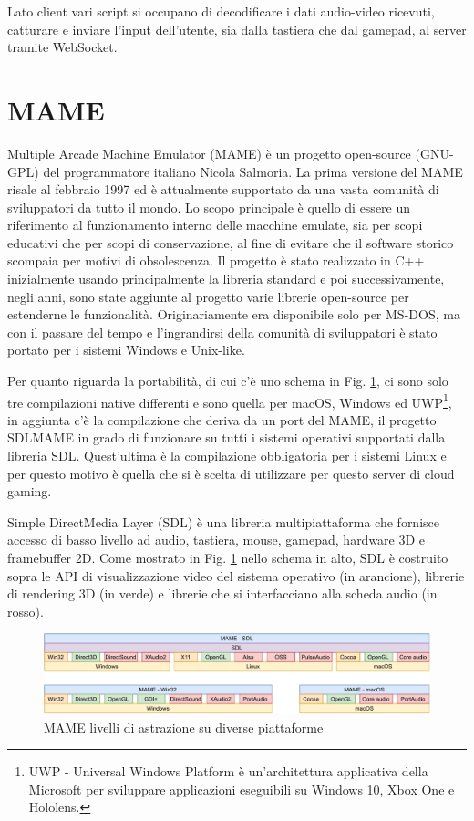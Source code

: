Lato client vari script si occupano di decodificare i dati audio-video ricevuti, catturare e inviare l'input dell'utente, sia dalla tastiera che dal gamepad, al server tramite WebSocket.



\section{MAME}
Multiple Arcade Machine Emulator (MAME) è un progetto open-source (GNU-GPL) del programmatore italiano Nicola Salmoria. La prima versione del MAME risale al febbraio 1997 ed è attualmente supportato da una vasta comunità di sviluppatori da tutto il mondo. Lo scopo principale è quello di essere un riferimento al funzionamento interno delle macchine emulate, sia per scopi educativi che per scopi di conservazione, al fine di evitare che il software storico scompaia per motivi di obsolescenza. Il progetto è stato realizzato in C++ inizialmente usando principalmente la libreria standard e poi successivamente, negli anni, sono state aggiunte al progetto varie librerie open-source per estenderne le funzionalità. Originariamente era disponibile solo per MS-DOS, ma con il passare del tempo e l'ingrandirsi della comunità di sviluppatori è stato portato per i sistemi Windows e Unix-like\cite{MAME}.

Per quanto riguarda la portabilità, di cui c'è uno schema in Fig. \ref{fig:mame_architettura_full}, ci sono solo tre compilazioni native differenti e sono quella per macOS, Windows ed UWP\footnote{UWP - Universal Windows Platform è un'architettura applicativa della Microsoft per sviluppare applicazioni eseguibili su Windows 10, Xbox One e Hololens.}, in aggiunta c'è la compilazione che deriva da un port del MAME, il progetto SDLMAME in grado di funzionare su tutti i sistemi operativi supportati dalla libreria SDL. Quest'ultima è la compilazione obbligatoria per i sistemi Linux e per questo motivo è quella che si è scelta di utilizzare per questo server di cloud gaming.

Simple DirectMedia Layer (SDL) è una libreria multipiattaforma che fornisce accesso di basso livello ad audio, tastiera, mouse, gamepad, hardware 3D e framebuffer 2D. Come mostrato in Fig. \ref{fig:mame_architettura_full} nello schema in alto, SDL è costruito sopra le API di visualizzazione video del sistema operativo (in arancione), librerie di rendering 3D (in verde) e librerie che si interfacciano alla scheda audio (in rosso)\cite{SDL_Wiki}. 

\begin{figure}[H]
	\includegraphics[width=\linewidth]{immagini/mame_architettura_full}
	\caption{MAME livelli di astrazione su diverse piattaforme}
	\label{fig:mame_architettura_full}
\end{figure}

